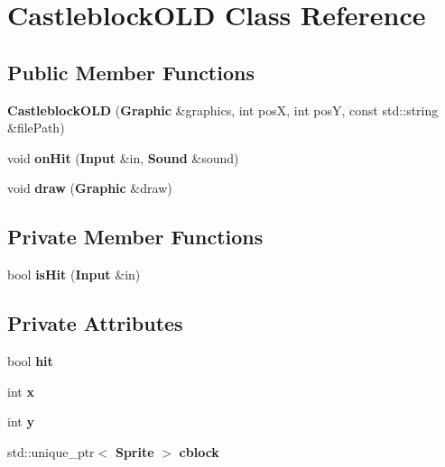 \section{Castleblock\+O\+L\+D Class Reference}
\label{class_castleblock_o_l_d}
\subsection*{Public Member Functions}
\begin{DoxyCompactItemize}
\item 
{\bfseries Castleblock\+O\+L\+D} ({\bf Graphic} \&graphics, int pos\+X, int pos\+Y, const std\+::string \&file\+Path)\label{class_castleblock_o_l_d_a8ad1f97522837dec4a32a13191f903a4}

\item 
void {\bfseries on\+Hit} ({\bf Input} \&in, {\bf Sound} \&sound)\label{class_castleblock_o_l_d_a544647c3b75536335078646b18e47ccb}

\item 
void {\bfseries draw} ({\bf Graphic} \&draw)\label{class_castleblock_o_l_d_a21f1c02d6abdd9608fab3be81d4c7361}

\end{DoxyCompactItemize}
\subsection*{Private Member Functions}
\begin{DoxyCompactItemize}
\item 
bool {\bfseries is\+Hit} ({\bf Input} \&in)\label{class_castleblock_o_l_d_a083e06e6e9f7ad729f9ffb3f750b6842}

\end{DoxyCompactItemize}
\subsection*{Private Attributes}
\begin{DoxyCompactItemize}
\item 
bool {\bfseries hit}\label{class_castleblock_o_l_d_ae4140cd84e64c1cba92109812b08f7bf}

\item 
int {\bfseries x}\label{class_castleblock_o_l_d_a41c5d96c49f29514580a64e5cd17e0b8}

\item 
int {\bfseries y}\label{class_castleblock_o_l_d_a6dbf64ae7dde90f8ea1edda3c382da0f}

\item 
std\+::unique\+\_\+ptr$<$ {\bf Sprite} $>$ {\bfseries cblock}\label{class_castleblock_o_l_d_afe01828923fa2d64c60cd4b957b0a865}

\end{DoxyCompactItemize}


